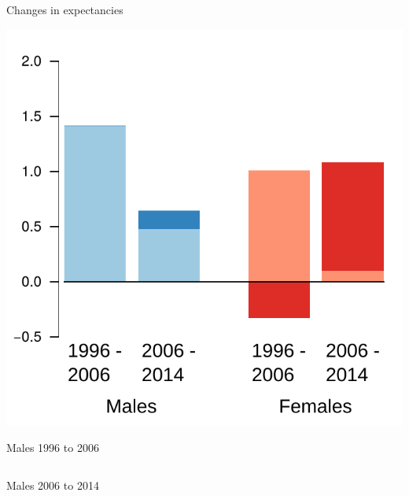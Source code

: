\documentclass[20pt,usenames,dvipsnames]{beamer}
\begin{document}
\begin{frame}[plain]
\Large 
\begin{center}
Changes in expectancies \vspace{1em}

\includegraphics{BarsDiffsInk.pdf}
\end{center}
\end{frame}


\begin{frame}[plain]
\Large
  \begin{center}
  Males 1996 to 2006 \vspace{1em}
  
    \begin{tabular}{rrr|r}
      
     \end{tabular}
   \end{center}
\end{frame}

\begin{frame}[plain]
\Large
  \begin{center}
  Males 2006 to 2014 \vspace{1em}
  
    \begin{tabular}{rrr|r}
      
     \end{tabular}
   \end{center}
\end{frame}
\end{document}
